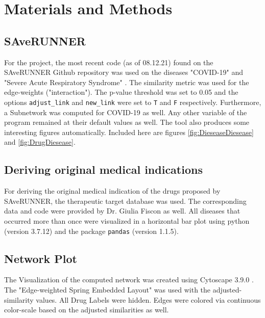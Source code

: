 \section{Materials and Methods}
\label{sec:Methods}

\subsection{SAveRUNNER}

For the project, the most recent code (as of 08.12.21) found on the SAveRUNNER Github repository
was used on the diseases "COVID-19" and "Severe Acute Respiratory Syndrome" \cite{Fiscon2021}.
The similarity metric was used for the edge-weights ("interaction"). The p-value threshold was set to 0.05 and the options \verb|adjust_link| and \verb|new_link| were set to \verb|T| and \verb|F| respectively.
Furthermore, a Subnetwork was computed for COVID-19 as well.
Any other variable of the program remained at their default values as well. 
The tool also produces some interesting figures automatically. Included here are figures \ref{fig:DieseaseDiesease} and \ref{fig:DrugDiesease}.
\subsection{Deriving original medical indications}

For deriving the original medical indication of the drugs proposed by SAveRUNNER, the therapeutic target database was used. The corresponding data and code were provided by Dr. Giulia Fiscon as well. All diseases that occurred more than once were visualized in a horizontal bar plot using python (version 3.7.12) and the package \verb|pandas| (version 1.1.5).

\subsection{Network Plot}

The Visualization of the computed network was created using Cytoscape 3.9.0 \cite{Shannon2003}. The "Edge-weighted Spring Embedded Layout" was used with the adjusted-similarity values. All Drug Labels were hidden. Edges were colored via continuous color-scale based on the adjusted similarities as well.


